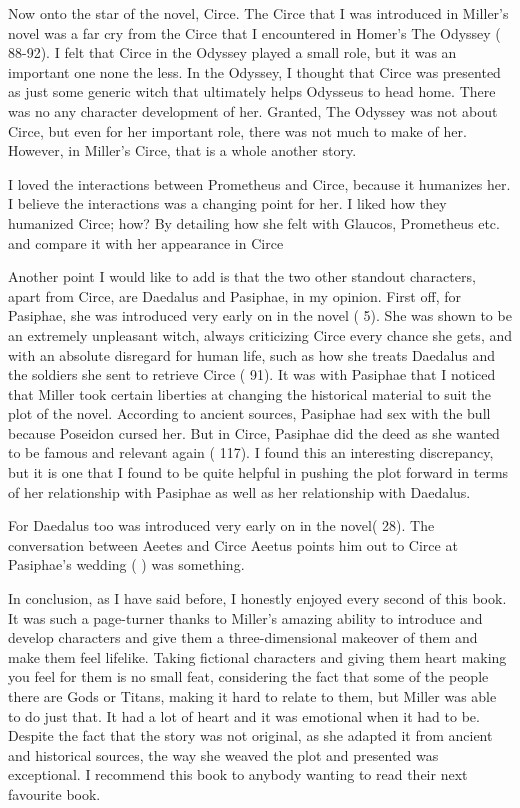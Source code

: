 \documentclass[12pt, a4paper]{article}
\begin{document}
Now onto the star of the novel, Circe. The Circe that I was introduced in Miller's novel was a far cry from the Circe that I encountered in Homer's The Odyssey (\cite{homer_odyssey_1998} 88-92). I felt that Circe in the Odyssey played a small role, but it was an important one none the less. In the Odyssey, I thought that Circe was presented as just some generic witch that ultimately helps Odysseus to head home. There was no any character development of her. Granted, The Odyssey was not about Circe, but even for her important role, there was not much to make of her. However, in Miller's Circe, that is a whole another story. 

I loved the interactions between Prometheus and Circe, because it humanizes her. I believe the interactions was a changing point for her. I liked how they humanized Circe; how? By detailing how she felt with Glaucos, Prometheus etc. and compare it with her appearance in Circe

Another point I would like to add is that the two other standout characters, apart from Circe, are Daedalus and Pasiphae, in my opinion. First off, for Pasiphae, she was introduced very early on in the novel (\cite{miller_circe_2018} 5). She was shown to be an extremely unpleasant witch, always criticizing Circe every chance she gets, and with an absolute disregard for human life, such as how she treats Daedalus and the soldiers she sent to retrieve Circe (\cite{miller_circe_2018} 91). It was with Pasiphae that I noticed that Miller took certain liberties at changing the historical material to suit the plot of the novel. According to ancient sources, Pasiphae had sex with the bull because Poseidon cursed her. But in Circe, Pasiphae did the deed as she wanted to be famous and relevant again (\cite{miller_circe_2018} 117). I found this an interesting discrepancy, but it is one that I found to be quite helpful in pushing the plot forward in terms of her relationship with Pasiphae as well as her relationship with Daedalus.

For Daedalus too was introduced very early on in the novel(\cite{miller_circe_2018} 28). The conversation between Aeetes and Circe Aeetus points him out to Circe at Pasiphae's wedding (\cite{miller_circe_2018} ) was something.

In conclusion, as I have said before, I honestly enjoyed every second of this book. It was such a page-turner thanks to Miller's amazing ability to introduce and develop characters and give them a three-dimensional makeover of them and make them feel lifelike. Taking fictional characters and giving them heart making you feel for them is no small feat, considering the fact that some of the people there are Gods or Titans, making it hard to relate to them, but Miller was able to do just that.  It had a lot of heart and it was emotional when it had to be. Despite the fact that the story was not original, as she adapted it from ancient and historical sources, the way she weaved the plot and presented was exceptional. I recommend this book to anybody wanting to read their next favourite book.

\newpage
\printbibliography
\end{document}
